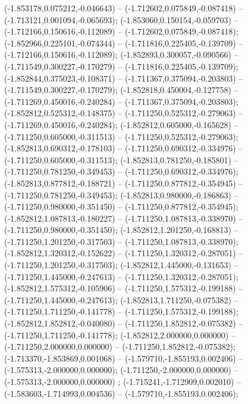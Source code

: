  (-1.853178,0.075212,-0.046643) -- (-1.712602,0.075849,-0.087418) -- (-1.713121,0.001094,-0.065693);
 (-1.853060,0.150154,-0.059703) -- (-1.712166,0.150616,-0.112089) -- (-1.712602,0.075849,-0.087418);
 (-1.852966,0.225101,-0.074344) -- (-1.711816,0.225405,-0.139709) -- (-1.712166,0.150616,-0.112089);
 (-1.852893,0.300057,-0.090566) -- (-1.711549,0.300227,-0.170279) -- (-1.711816,0.225405,-0.139709);
 (-1.852844,0.375023,-0.108371) -- (-1.711367,0.375094,-0.203803) -- (-1.711549,0.300227,-0.170279);
 (-1.852818,0.450004,-0.127758) -- (-1.711269,0.450016,-0.240284) -- (-1.711367,0.375094,-0.203803);
 (-1.852812,0.525312,-0.148375) -- (-1.711250,0.525312,-0.279063) -- (-1.711269,0.450016,-0.240284);
 (-1.852812,0.605000,-0.165628) -- (-1.711250,0.605000,-0.311513) -- (-1.711250,0.525312,-0.279063);
 (-1.852813,0.690312,-0.178103) -- (-1.711250,0.690312,-0.334976) -- (-1.711250,0.605000,-0.311513);
 (-1.852813,0.781250,-0.185801) -- (-1.711250,0.781250,-0.349453) -- (-1.711250,0.690312,-0.334976);
 (-1.852813,0.877812,-0.188721) -- (-1.711250,0.877812,-0.354945) -- (-1.711250,0.781250,-0.349453);
 (-1.852813,0.980000,-0.186863) -- (-1.711250,0.980000,-0.351450) -- (-1.711250,0.877812,-0.354945);
 (-1.852812,1.087813,-0.180227) -- (-1.711250,1.087813,-0.338970) -- (-1.711250,0.980000,-0.351450);
 (-1.852812,1.201250,-0.168813) -- (-1.711250,1.201250,-0.317503) -- (-1.711250,1.087813,-0.338970);
 (-1.852812,1.320312,-0.152622) -- (-1.711250,1.320312,-0.287051) -- (-1.711250,1.201250,-0.317503);
 (-1.852812,1.445000,-0.131653) -- (-1.711250,1.445000,-0.247613) -- (-1.711250,1.320312,-0.287051);
 (-1.852812,1.575312,-0.105906) -- (-1.711250,1.575312,-0.199188) -- (-1.711250,1.445000,-0.247613);
 (-1.852813,1.711250,-0.075382) -- (-1.711250,1.711250,-0.141778) -- (-1.711250,1.575312,-0.199188);
 (-1.852812,1.852812,-0.040080) -- (-1.711250,1.852812,-0.075382) -- (-1.711250,1.711250,-0.141778);
 (-1.852812,2.000000,0.000000) -- (-1.711250,2.000000,0.000000) -- (-1.711250,1.852812,-0.075382);
 (-1.713370,-1.853869,0.001068) -- (-1.579710,-1.855193,0.002406) -- (-1.575313,-2.000000,0.000000);
 (-1.711250,-2.000000,0.000000) -- (-1.575313,-2.000000,0.000000) ;
 (-1.715241,-1.712909,0.002010) -- (-1.583603,-1.714993,0.004536) -- (-1.579710,-1.855193,0.002406);
